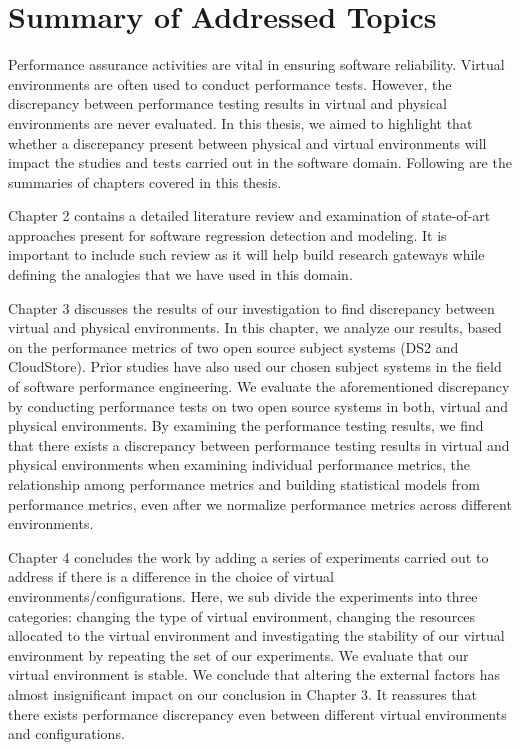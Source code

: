 



\section{Summary of Addressed Topics}


Performance assurance activities are vital in ensuring software reliability. Virtual environments are often used to conduct performance tests. However, the discrepancy between performance testing results in virtual and physical environments are never evaluated. In this thesis, we aimed to highlight that whether a discrepancy present between physical and virtual environments will impact the studies and tests carried out in the software domain. Following are the summaries of chapters covered in this thesis.

Chapter 2 contains a detailed literature review and examination of state-of-art approaches present for software regression detection and modeling. It is important to include such review as it will help build research gateways while defining the analogies that we have used in this domain. 

Chapter 3 discusses the results of our investigation to find discrepancy between virtual and physical environments. In this chapter, we analyze our results, based on the performance metrics of two open source subject systems (DS2 and CloudStore). Prior studies have also used our chosen subject systems in the field of software performance engineering. We evaluate the aforementioned discrepancy by conducting performance tests on two open source systems in both, virtual and physical environments. By examining the performance testing results, we find that there exists a discrepancy between performance testing results in virtual and physical environments when examining individual performance metrics, the relationship among performance metrics and building statistical models from performance metrics, even after we normalize performance metrics across different environments. 

Chapter 4 concludes the work by adding a series of experiments carried out to address if there is a difference in the choice of virtual environments/configurations. Here, we sub divide the experiments into three categories: changing the type of virtual environment, changing the resources allocated to the virtual environment and investigating the stability of our virtual environment by repeating the set of our experiments. We evaluate that our virtual environment is stable. We conclude that altering the external factors has almost insignificant impact on our conclusion in Chapter 3. It reassures that there exists performance discrepancy even between different virtual environments and configurations.  
 
